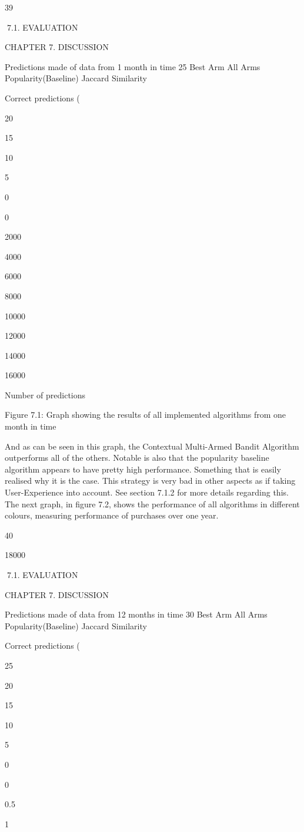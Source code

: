 39

7.1. EVALUATION

CHAPTER 7. DISCUSSION

Predictions made of data from 1 month in time
25
Best Arm
All Arms
Popularity(Baseline)
Jaccard Similarity

Correct predictions (%

20

15

10

5

0

0

2000

4000

6000

8000

10000

12000

14000

16000

Number of predictions

Figure 7.1: Graph showing the results of all implemented algorithms from one month in
time

And as can be seen in this graph, the Contextual Multi-Armed Bandit Algorithm outperforms all of the others. Notable is also that the popularity baseline algorithm appears
to have pretty high performance. Something that is easily realised why it is the case.
This strategy is very bad in other aspects as if taking User-Experience into account. See
section 7.1.2 for more details regarding this.
The next graph, in figure 7.2, shows the performance of all algorithms in different colours,
measuring performance of purchases over one year.

40

18000

7.1. EVALUATION

CHAPTER 7. DISCUSSION

Predictions made of data from 12 months in time
30
Best Arm
All Arms
Popularity(Baseline)
Jaccard Similarity

Correct predictions (%

25

20

15

10

5

0

0

0.5

1

